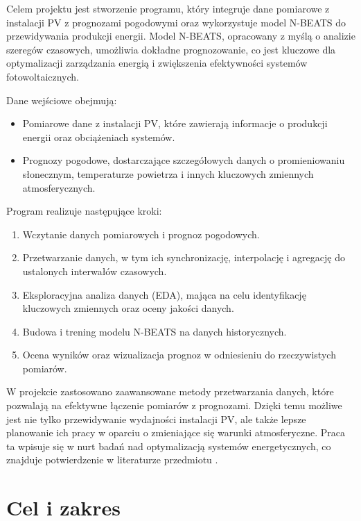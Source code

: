 \documentclass[a4paper,fleqn,final]{cas-dc}\usepackage[authoryear,longnamesfirst]{natbib}
\begin{document}
Celem projektu jest stworzenie programu, który integruje dane pomiarowe z instalacji PV z prognozami pogodowymi oraz wykorzystuje model N-BEATS do przewidywania produkcji energii. Model N-BEATS, opracowany z myślą o analizie szeregów czasowych, umożliwia dokładne prognozowanie, co jest kluczowe dla optymalizacji zarządzania energią i zwiększenia efektywności systemów fotowoltaicznych.

Dane wejściowe obejmują:
\begin{itemize}
    \item Pomiarowe dane z instalacji PV, które zawierają informacje o produkcji energii oraz obciążeniach systemów.
    \item Prognozy pogodowe, dostarczające szczegółowych danych o promieniowaniu słonecznym, temperaturze powietrza i innych kluczowych zmiennych atmosferycznych.
\end{itemize}

Program realizuje następujące kroki:
\begin{enumerate}
    \item Wczytanie danych pomiarowych i prognoz pogodowych.
    \item Przetwarzanie danych, w tym ich synchronizację, interpolację i agregację do ustalonych interwałów czasowych.
    \item Eksploracyjna analiza danych (EDA), mająca na celu identyfikację kluczowych zmiennych oraz oceny jakości danych.
    \item Budowa i trening modelu N-BEATS na danych historycznych.
    \item Ocena wyników oraz wizualizacja prognoz w odniesieniu do rzeczywistych pomiarów.
\end{enumerate}

W projekcie zastosowano zaawansowane metody przetwarzania danych, które pozwalają na efektywne łączenie pomiarów z prognozami. Dzięki temu możliwe jest nie tylko przewidywanie wydajności instalacji PV, ale także lepsze planowanie ich pracy w oparciu o zmieniające się warunki atmosferyczne. Praca ta wpisuje się w nurt badań nad optymalizacją systemów energetycznych, co znajduje potwierdzenie w literaturze przedmiotu \cite{oreshkin2020nbeats, liu2021pv, little2002missingdata}.


\section{Cel i zakres}
\end{document}
